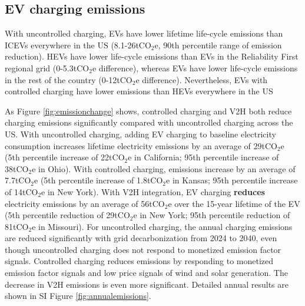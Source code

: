 \documentclass[11pt,preprint]{elsarticle}
\begin{document}
\subsection{EV charging emissions}

With uncontrolled charging, EVs have lower lifetime life-cycle emissions than ICEVs everywhere in the US (8.1-26tCO$_2$e, 90th percentile range of emission reduction). HEVs have lower life-cycle emissions than EVs in the Reliability First regional grid (0-5.3tCO$_2$e difference), whereas EVs have lower life-cycle emissions in the rest of the country (0-12tCO$_2$e difference). Nevertheless, EVs with controlled charging have lower emissions than HEVs everywhere in the US

As Figure \ref{fig:emissionchange} shows, controlled charging and V2H both reduce charging emissions significantly compared with uncontrolled charging across the US. With uncontrolled charging, adding EV charging to baseline electricity consumption increases lifetime electricity emissions by an average of 29tCO$_2$e (5th percentile increase of 22tCO$_2$e in California; 95th percentile increase of 38tCO$_2$e in Ohio). With controlled charging, emissions increase by an average of 7.7tCO$_2$e (5th percentile increase of 1.8tCO$_2$e in Kansas; 95th percentile increase of 14tCO$_2$e in New York). With V2H integration, EV charging \textbf{reduces} electricity emissions by an average of 56tCO$_2$e over the 15-year lifetime of the EV (5th percentile reduction of 29tCO$_2$e in New York; 95th percentile reduction of 81tCO$_2$e in Missouri). For uncontrolled charging, the annual charging emissions are reduced significantly with grid decarbonization from 2024 to 2040, even though uncontrolled charging does not respond to monetized emission factor signals. Controlled charging reduces emissions by responding to monetized emission factor signals and low price signals of wind and solar generation. The decrease in V2H emissions is even more significant. Detailed annual results are shown in SI Figure \ref{fig:annualemissions}.
\end{document}
